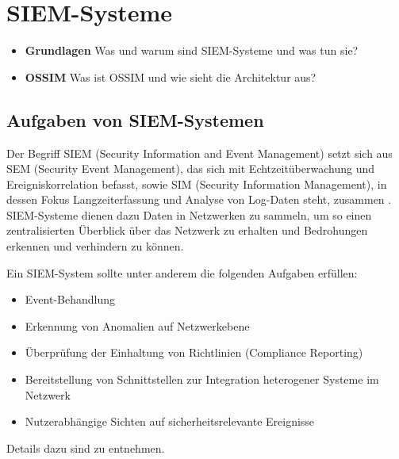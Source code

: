 \chapter{SIEM-Systeme}

\begin{itemize}
  \item \textbf{Grundlagen} Was und warum sind SIEM-Systeme und was tun sie?
  \item \textbf{OSSIM} Was ist OSSIM und wie sieht die Architektur aus?
\end{itemize}





\label{cha_siem}



\section{Aufgaben von SIEM-Systemen}

Der Begriff SIEM (Security Information and Event Management) setzt sich aus SEM (Security Event Management), das sich mit Echtzeitüberwachung und Ereigniskorrelation befasst, sowie SIM (Security Information Management), in dessen Fokus Langzeiterfassung und Analyse von Log-Daten steht, zusammen \cite{gartner2011}. SIEM-Systeme dienen dazu Daten in Netzwerken zu sammeln, um so einen zentralisierten Überblick über das Netzwerk zu erhalten und Bedrohungen erkennen und verhindern zu können. 

Ein SIEM-System sollte unter anderem die folgenden Aufgaben erfüllen: 
\begin{itemize}
	\item Event-Behandlung
	\item Erkennung von Anomalien auf Netzwerkebene
	\item Überprüfung der Einhaltung von Richtlinien (Compliance Reporting)
	\item Bereitstellung von Schnittstellen zur Integration heterogener Systeme im Netzwerk %
	\item Nutzerabhängige Sichten auf sicherheitsrelevante Ereignisse %
\end{itemize} 
Details dazu sind \cite{detken2015} zu entnehmen.

